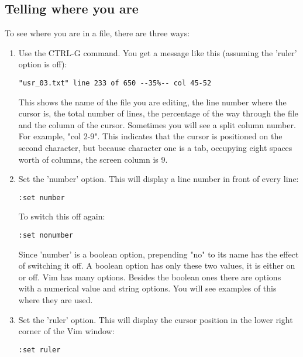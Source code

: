 \subsection{Telling where you are}
To see where you are in a file, there are three ways:
\begin{enumerate}
				\item  Use the CTRL-G command.
								You get a message like this (assuming the 'ruler' option is off):
								\begin{Verbatim}[samepage=true]
	"usr_03.txt" line 233 of 650 --35%-- col 45-52 
								\end{Verbatim}

								This shows the name of the file you are editing, the line number where the cursor is, the total number of lines, the percentage of the way through the file and the column of the cursor.
								Sometimes you will see a split column number.
								For example, "col 2-9".
								This indicates that the cursor is positioned on the second character, but because character one is a tab, occupying eight spaces worth of columns, the screen column is 9.

				\item  Set the 'number' option.  This will display a line number in front of
								every line:

								\begin{Verbatim}[samepage=true]
	:set number
								\end{Verbatim}

								To switch this off again:

								\begin{Verbatim}[samepage=true]
	:set nonumber
								\end{Verbatim}

								Since 'number' is a boolean option, prepending "no" to its name has the effect of switching it off.
								A boolean option has only these two values, it is either on or off.
								Vim has many options.
								Besides the boolean ones there are options with a numerical value and string options.
								You will see examples of this where they are used.

				\item  Set the 'ruler' option.
								This will display the cursor position in the lower right corner of the Vim window:

								\begin{Verbatim}[samepage=true]
	:set ruler
								\end{Verbatim}

\end{enumerate}


